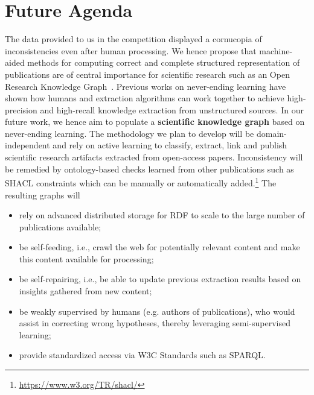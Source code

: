 \documentclass[runningheads]{llncs}
\begin{document}
	\section{Future Agenda}
	The data provided to us in the competition displayed a cornucopia of inconsistencies even after human processing. We hence propose that machine-aided methods for computing correct and complete structured representation of publications are of central importance for scientific research such as an Open Research Knowledge Graph~\cite{DBLP:journals/corr/abs-1901-10816}\cite{DBLP:conf/esws/BuscaldiDMOR19}. Previous works on never-ending learning have shown how humans and extraction algorithms can work together to achieve high-precision and high-recall knowledge extraction from unstructured sources. In our future work, we hence aim to 
	populate a \textbf{scientific knowledge graph} based on never-ending learning. The methodology we plan to develop will be domain-independent and rely on active learning to classify, extract, link and publish scientific research artifacts extracted from open-access papers.  %
	Inconsistency will be remedied by ontology-based checks learned from other publications such as SHACL constraints which can be manually or automatically added.\footnote{\url{https://www.w3.org/TR/shacl/}}
	The resulting graphs will
	\begin{itemize}
		\item rely on advanced distributed storage for RDF to scale to the large number of publications available;
		\item be self-feeding, i.e., crawl the web for potentially relevant content and make this content available for processing;
		\item be self-repairing, i.e., be able to update previous extraction results based on insights gathered from new content;
		\item be weakly supervised by humans (e.g. authors of publications), who would assist in correcting wrong hypotheses, thereby leveraging semi-supervised learning;
		\item provide standardized access via W3C Standards such as SPARQL.
	\end{itemize}
	
\end{document}
